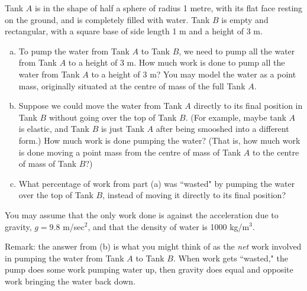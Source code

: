 \begin{Mquestion}
Tank $A$ is in the shape of half a sphere of radius 1 metre, with its flat face resting on the ground, and is completely filled with water. Tank $B$ is empty and rectangular, with a square base of side length 1 m and a height of 3 m.

\begin{center}
\end{center}
\begin{enumerate}[(a)]
\item To pump the water from Tank $A$ to Tank $B$, we need to pump all the water from Tank $A$ to a height of 3 m. How much work is done to pump all the water from Tank $A$ to a height of 3 m? You may model the water as a point mass, originally situated at the centre of mass of the full Tank $A$.
\item Suppose we could move the water from Tank $A$ directly to its final position in Tank $B$ without going over the top of Tank $B$. (For example, maybe tank $A$ is elastic, and Tank $B$ is just Tank $A$ after being smooshed into a different form.) How much work is done pumping the water? (That is, how much work is done moving a point mass from the centre of mass of Tank $A$ to the centre of mass of Tank $B$?)
\item What percentage of work from part (a) was ``wasted" by pumping the water over the top of Tank $B$, instead of moving it directly to its final position?
\end{enumerate}
You may assume that the only work done is against the acceleration due to gravity, $g=9.8$ m/sec$^2$, and that the density of water is 1000 kg/m$^3$.

Remark: the answer from (b) is what you might think of as the \emph{net} work involved in pumping the water from Tank $A$ to Tank $B$. When work gets ``wasted,"  the pump does some work pumping water up, then gravity does equal and opposite work bringing the water back down.
\end{Mquestion}
